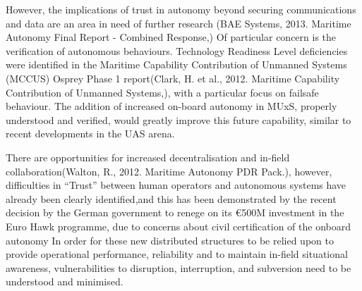  However, the implications of trust in autonomy beyond securing communications and data are an area in need of further research (BAE Systems, 2013. Maritime Autonomy Final Report - Combined Response,)
 Of particular concern is the verification of autonomous behaviours.
 Technology Readiness Level deficiencies were identified in the Maritime Capability Contribution of Unmanned Systems (MCCUS) Osprey Phase 1 report(Clark, H. et al., 2012. Maritime Capability Contribution of Unmanned Systems,), with a particular focus on failsafe behaviour.
 The addition of increased on-board autonomy in MUxS, properly understood and verified, would greatly improve this future capability, similar to recent developments in the UAS arena\cite{Cummings2010}.
 
 There are opportunities for increased decentralisation and in-field collaboration(Walton, R., 2012. Maritime Autonomy PDR Pack.), however, difficulties in “Trust” between human operators and autonomous systems have already been clearly identified\cite{Chen2011b},and this has been demonstrated by the recent decision by the German government to renege on its €500M investment in the Euro Hawk programme, due to concerns about civil certification of the onboard autonomy\cite{Mehta2013}
 In order for these new distributed structures to be relied upon to provide operational performance, reliability and to maintain in-field situational awareness, vulnerabilities to disruption, interruption, and subversion need to be understood and minimised.
 
 \ifx\ifthesis\undefined
 	
 \else
 \fi
 
